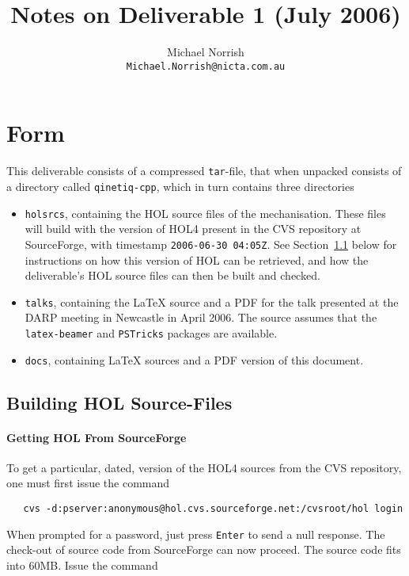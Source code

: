 \documentclass[11pt]{article}
\title{Notes on Deliverable 1 (July 2006)}
\author{Michael Norrish\\{\small \texttt{Michael.Norrish@nicta.com.au}}}
\date{}
\begin{document}
\maketitle

\section{Form}

This deliverable consists of a compressed \texttt{tar}-file, that when
unpacked consists of a directory called \texttt{qinetiq-cpp}, which in
turn contains three directories
\begin{itemize}
\item \texttt{holsrcs}, containing the HOL source files of the
  mechanisation.  These files will build with the version of HOL4
  present in the CVS repository at SourceForge, with timestamp
  \texttt{2006-06-30 04:05Z}.  See Section~\ref{sec:getting-hol}
  below for instructions on how this version of HOL can be retrieved,
  and how the deliverable's HOL source files can then be built and
  checked.
\item \texttt{talks}, containing the \LaTeX{} source and a PDF for the
  talk presented at the DARP meeting in Newcastle in April 2006.  The
  source assumes that the \texttt{latex-beamer} and \texttt{PSTricks}
  packages are available.
\item \texttt{docs}, containing \LaTeX{} sources and a PDF version of
  this document.
\end{itemize}

\subsection{Building HOL Source-Files}
\label{sec:getting-hol}

\paragraph{Getting HOL From SourceForge}

To get a particular, dated, version of the HOL4 sources from the CVS
repository, one must first issue the command

{\small
\begin{verbatim}
   cvs -d:pserver:anonymous@hol.cvs.sourceforge.net:/cvsroot/hol login
\end{verbatim}
}

When prompted for a password, just press \texttt{Enter} to send a null
response.  The check-out of source code from SourceForge can now
proceed.  The source code fits into 60MB.  Issue the command
\end{document}
